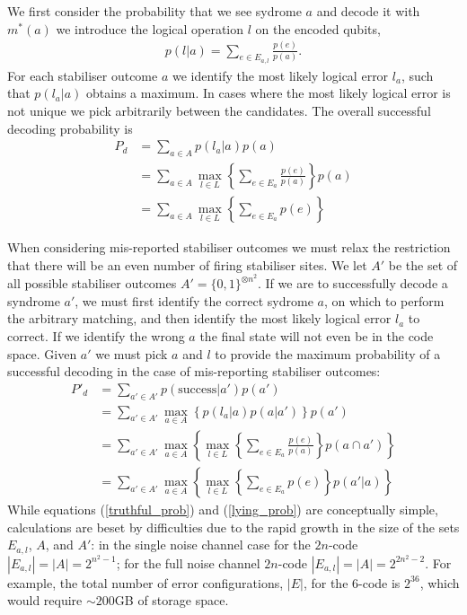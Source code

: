 We first consider the probability that we see sydrome $a$ and decode it with $m^*(a)$ we introduce the logical operation $l$ on the encoded qubits,
\begin{align}
  p(l \vert a) = \sum_{e \in E_{a,l}} \frac{p(e)}{p(a)}. 
\end{align}
For each stabiliser outcome $a$ we identify the most likely logical error $l_a$, such that $p(l_a \vert a)$ obtains a maximum. In cases where the most likely logical error is not unique we pick arbitrarily between the candidates. The overall successful decoding probability is 
\begin{align}
  P_d &= \sum_{a \in A} p(l_a \vert a)p(a) \\
  &= \sum_{a \in A} \max_{l\in L} \left\{ \sum_{e \in E_a} \frac{p(e)}{p(a)} \right\} p(a) \\
  &= \sum_{a \in A} \max_{l\in L} \left\{ \sum_{e \in E_a} p(e) \right\} \label{truthful_prob}
\end{align}

When considering mis-reported stabiliser outcomes we must relax the restriction that there will be an even number of firing stabiliser sites. We let $A'$ be the set of all possible stabiliser outcomes $A' = \{0, 1\}^{\otimes n^2}$. If we are to successfully decode a syndrome $a'$, we must first identify the correct sydrome $a$, on which to perform the arbitrary matching, and then identify the most likely logical error $l_a$ to correct. If we identify the wrong $a$ the final state will not even be in the code space. Given $a'$ we must pick $a$ and $l$ to provide the maximum probability of a successful decoding in the case of mis-reporting stabiliser outcomes:
\begin{align}
  P'_d &= \sum_{a' \in A'} p(\text{success} \vert a') p(a') \\
  &= \sum_{a'\in A'} \max_{a \in A} \left\{ p(l_a \vert a) p(a \vert a') \right\} p(a')\\
  &= \sum_{a'\in A'} \max_{a \in A} \left\{ \max_{l \in L} \left\{\sum_{e \in E_a} \frac{p(e)}{p(a)} \right\} p(a \cap a') \right\}\\
  &= \sum_{a'\in A'} \max_{a \in A} \left\{ \max_{l \in L} \left\{\sum_{e \in E_a} p(e) \right\} p(a' \vert a) \right\} \label{lying_prob}
\end{align}
While equations (\ref{truthful_prob}) and (\ref{lying_prob}) are conceptually simple, calculations are beset by difficulties due to the rapid growth in the size of the sets $E_{a,l}$, $A$, and $A'$: in the single noise channel case for the $2n$-code $|E_{a,l}| = |A| = 2^{n^2-1}$; for the full noise channel $2n$-code $|E_{a,l}| = |A| = 2^{2n^2 - 2}$. For example, the total number of error configurations, $|E|$, for the $6$-code is $2^{36}$, which would require $\sim200$GB of storage space.

